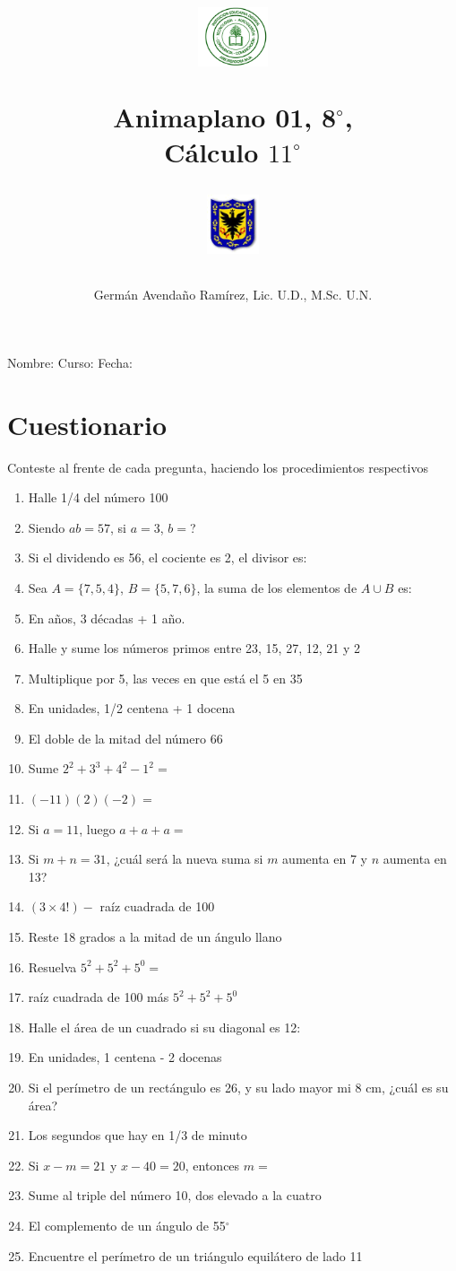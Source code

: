 \documentclass[10pt,twoside]{article}
\author{Germ\'an Avenda\~no Ram\'irez, Lic. U.D., M.Sc. U.N.}
\title{\begin{minipage}{.2\textwidth}
\includegraphics[height=1.75cm]{Images/logo-colegio.png}\end{minipage}
\begin{minipage}{.55\textwidth}
\begin{center}
Animaplano 01, 8$^{\circ}$,  \\
Cálculo $11^{\circ}$
\end{center}
\end{minipage}\hfill
\begin{minipage}{.2\textwidth}
\includegraphics[height=1.75cm]{Images/logo-sed.png} 
\end{minipage}}
\date{}
\begin{document}
\maketitle
Nombre: \hrulefill Curso: \underline{\hspace*{44pt}} Fecha: \underline{\hspace*{2.5cm}}
\section*{Cuestionario}
Conteste al frente de cada pregunta, haciendo los procedimientos respectivos
\begin{enumerate}
 \item Halle 1/4 del número 100
 \item Siendo $ab=57$, si $a=3$, $b=$?
 \item Si el dividendo es 56, el cociente es 2, el divisor es:
 \item Sea $A=\{7,5,4\}$, $B=\{5,7,6\}$, la suma de los elementos de $A\cup B$ es:
 \item En años, 3 décadas + 1 año.
 \item Halle y sume los números primos entre 23, 15, 27, 12, 21 y 2
 \item Multiplique por 5, las veces en que está el 5 en 35
 \item En unidades, 1/2 centena + 1 docena
 \item El doble de la mitad del número 66
 \item Sume $2^{2}+3^{3}+4^{2}-1^{2}=$
 \item $(-11)(2)(-2)=$
 \item Si $a=11$, luego $a+a+a=$
 \item Si $m+n=31$, ¿cuál será la nueva suma si $m$ aumenta en 7 y $n$ aumenta en 13?
 \item $(3\times4!)-$ raíz cuadrada de 100
 \item Reste 18 grados a la mitad de un ángulo llano
 \item Resuelva $5^{2}+5^{2}+5^{0}=$
 \item raíz cuadrada de 100 más $5^{2}+5^{2}+5^{0}$
 \item Halle el área de un cuadrado si su diagonal es 12:
 \item En unidades, 1 centena - 2 docenas
 \item Si el perímetro de un rectángulo es 26, y su lado mayor mi 8 cm, ¿cuál es su área?
 \item Los segundos que hay en 1/3 de minuto
 \item Si $x-m=21$ y $x-40=20$, entonces $m=$
 \item Sume al triple del número 10, dos elevado a la cuatro
 \item El complemento de un ángulo de 55$^{\circ}$
 \item Encuentre el perímetro de un triángulo equilátero de lado 11
\end{enumerate}
\end{document}
